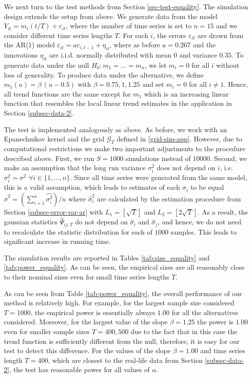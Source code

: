 We next turn to the test methods from Section \ref{sec-test-equality}. The simulation design extends the setup from above. We generate data from the model $Y_{it} = m_i(t/T) + \varepsilon_{it}$, where the number of time series is set to $n = 15$ and we consider different time series lengths $T$. For each $i$, the errors $\varepsilon_{it}$ are drawn from the AR(1) model $\varepsilon_{it} = a \varepsilon_{i,t-1} + \eta_{it}$, where as before $a = 0.267$ and the innovations $\eta_{it}$ are i.i.d. normally distributed with mean $0$ and variance $0.35$. To generate data under the null $H_0: m_1 = \ldots = m_n$, we let $m_i = 0$ for all $i$ without loss of generality. To produce data under the alternative, we define $m_1(u) = \beta \, (u - 0.5) $ with $\beta = 0.75, 1, 1.25$ and set $m_i = 0$ for all $i \ne 1$. Hence, all trend functions are the same except for $m_1$ which is an increasing linear function that resembles the local linear trend estimates in the application in Section \ref{subsec-data-2}. 


The test is implemented analogously as above. As before, we work with an Epanechnikov kernel and the grid $\mathcal{G}_T$ defined in \eqref{grid-sim-app}. However, due to computational restrictions we make two important adjustments to the procedure described above. First, we run $S = 1000$ simulations instead of $10000$. Second, we make an assumption that the long run variance $\sigma_i^2$ does not depend on $i$, i.e. $\sigma_i^2 = \sigma^2$ $\forall i\in \{1, \ldots, n\}$. Since all time series were generated from the same model, this is a valid assumption, which leads to estimates of each $\sigma_i$ to be equal $\widehat{\sigma}^2 = (\sum_{i = 1}^n\widehat{\sigma_i^2})/n$ where $\widehat{\sigma}_i^2$ are calculated by the estimation procedure from Section \ref{subsec-error-var-ar} with $L_1 = [\sqrt{T}]$ and $L_2 = [2 \sqrt{T}]$. As a result, the gaussian statistics $\widehat{\Psi}_{ij, T}$ do not depend on $\widehat{\sigma}_i$ and $\widehat{\sigma}_j$, and hence, we do not need to recalculate the statistic distribution for each of $1000$ samples. This leads to significant increase in running time.


The simulation results are reported in Tables \ref{tab:size_equality} and \ref{tab:power_equality}. As can be seen, the empirical sizes are all reasonably close to their nominal sizes even for small time series lengths $T$.


As can be seen from Table \ref{tab:power_equality}, the overall performance of our method is relatively high. For example, for the largest sample size considered $T = 1000$, the empirical power is essentially always $1.00$ for all the alternatives considered. Moreover, for the largest value of the slope $\beta = 1.25$ the power is $1.00$ even for smaller sample sizes $T = 400, 500$ due to the fact that in this case the trend function is sufficiently different from the null, therefore, it is easy for our test to detect this difference. For the values of the slope $\beta = 1.00$ and time series length $T = 400$, which are closest to the real-life data from Section \ref{subsec-data-2}, the test has reasonable power for all values of $\alpha$.



